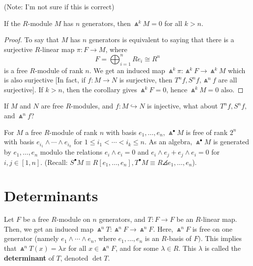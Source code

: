 (Note: I'm not sure if this is correct)

\begin{cor}
    If the $R$-module $M$ has $n$ generators, then $\Wedge ^kM = 0$ for all $k > n$.
\end{cor}

\begin{proof}
    To say that $M$ has $n$ generators is equivalent to saying that there is a surjective $R$-linear map $\pi: F \to M$, where
    $$F = \bigoplus_{i=1}^nRe_i \cong R^n$$
    is a free $R$-module of rank $n$. We get an induced map $\Wedge ^k \pi : \Wedge ^kF \to \Wedge ^kM$ which is also surjective [In fact, if $f: M \to N$ is surjective, then $T^nf,S^nf,\Wedge^nf$ are all surjective]. If $k>n$, then the corollary gives $\Wedge ^kF = 0$, hence $\Wedge ^kM =0$ also.
\end{proof}

\begin{notebox*}[Challenge]
    If $M$ and $N$ are free $R$-modules, and $f:M \hookrightarrow N$ is injective, what about $T^nf,S^nf,$ and $\Wedge^nf$?
\end{notebox*}

\begin{ex}
    For $M$ a free $R$-module of rank $n$ with basis $e_1,\dots,e_n$, $\Wedge^\bullet M$ is free of rank $2^n$ with basis $e_{i_1}\land \cdots \land e_{i_k}$ for $1 \leq i_1 < \cdots < i_k \leq n$. As an algebra, $\Wedge ^\bullet M$ is generated by $e_1,\dots ,e_n$ modulo the relations $e_i \land e_i=0$ and $e_i \land e_j + e_j \land e_i =0$ for $i,j \in [1,n]$. (Recall: $S^\bullet M \equiv R[e_1,\dots,e_n], T^\bullet M \equiv R \angles {e_1,\dots,e_n}$).
\end{ex}

\section{Determinants}

\begin{defn}
    Let $F$ be a free $R$-module on $n$ generators, and $T:F \to F$ be an $R$-linear map. Then, we get an induced map $\Wedge^nT: \Wedge^nF \to \Wedge^nF$. Here, $\Wedge^nF$ is free on one generator (namely $e_1 \land \cdots \land e_n$, where $e_1,\dots,e_n$ is an $R$-basis of $F)$. This implies that $\Wedge^nT(x) = \lambda x$ for all $x \in \Wedge^nF$, and for some $\lambda \in R$. This $\lambda$ is called the \textbf{determinant} of $T$, denoted $\det T$.
\end{defn}

